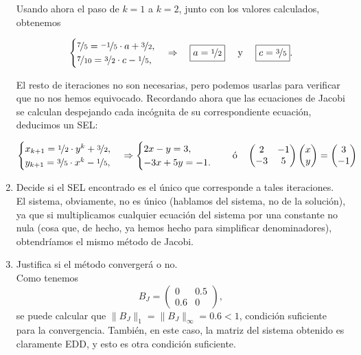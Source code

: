 \documentclass[12pt]{article}
\begin{document}
\begin{ejercicio}
\begin{enumerate}[label=\alph*)]
				Usando ahora el paso de $k=1$ a $k=2$, junto con los valores calculados, obtenemos
				
				$$\begin{cases}
					\nicefrac{7}{5} = \nicefrac{-1}{5} \cdot a + \nicefrac{3}{2}, \\
					\nicefrac{7}{10} = \nicefrac{3}{2} \cdot c - \nicefrac{1}{5},
				\end{cases} \Rightarrow \quad \boxed{a = \nicefrac{1}{2}} \quad \text{ y } \quad \boxed{c = \nicefrac{3}{5}}.$$
				
				El resto de iteraciones no son necesarias, pero podemos usarlas para verificar que no nos hemos equivocado. Recordando ahora que las ecuaciones de Jacobi se calculan despejando cada incógnita de su correspondiente ecuación, deducimos un SEL:
				
				$$\begin{cases}
					x_{k+1} = \nicefrac{1}{2} \cdot y^k + \nicefrac{3}{2}, \\
					y_{k+1} = \nicefrac{3}{5} \cdot x^k - \nicefrac{1}{5},
				\end{cases} \Rightarrow 
				\begin{cases}
					2x - y = 3, \\
					-3x + 5y = -1.
				\end{cases} \quad \text{ó} \quad
				\begin{pmatrix}
					2 & -1 \\
					-3 & 5
				\end{pmatrix}
				\begin{pmatrix}
					x \\
					y
				\end{pmatrix}
				=
				\begin{pmatrix}
					3 \\
					-1
				\end{pmatrix}$$
				
			
			\item Decide si el SEL encontrado es el único que corresponde a tales iteraciones. \\
			
				El sistema, obviamente, no es único (hablamos del sistema, no de la solución), ya que si multiplicamos
				cualquier ecuación del sistema por una constante no nula (cosa que, de hecho, ya hemos hecho para simplificar
				denominadores), obtendríamos el mismo método de Jacobi.
			
			\item Justifica si el método convergerá o no. \\
			
				Como tenemos 
				$$B_J = 
				\begin{pmatrix}
					0 & 0.5 \\
					0.6 & 0
				\end{pmatrix},$$
				se puede calcular que $\|B_J\|_1 = \|B_J\|_\infty = 0.6 < 1$, condición suficiente
				para la convergencia. También, en este caso, la matriz del sistema obtenido es claramente EDD, y esto es
				otra condición suficiente.
				
		\end{enumerate}
	\end{ejercicio}
	
\end{document}
